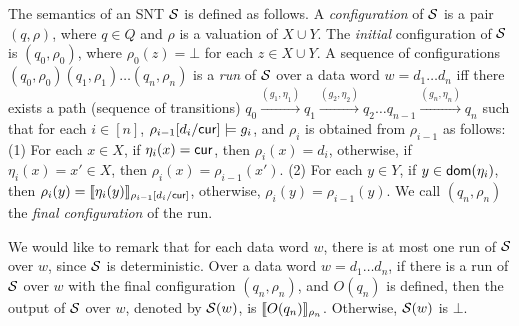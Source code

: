 The semantics of an SNT ${\mathcal{S} }$  is defined as follows. A \emph{configuration} of ${\mathcal{S} }$ is a pair $(q,\rho)$, where $q \in Q$ and $\rho$ is a valuation of $X \cup Y$. The \emph{initial} configuration of ${\mathcal{S} }$ is $(q_0,\rho_0)$, where $\rho_0(z)=\bot$ for each $z \in X\cup Y$.
A sequence of configurations $(q_0,\rho_0)(q_1,\rho_1)\ldots(q_n,\rho_n)$ is
a \emph{run} of ${\mathcal{S} }$ over a data word $w=d_1 \dots d_n$ iff there exists a path (sequence of transitions) $q_0 \xrightarrow{(g_1,\eta_1)} q_1 \xrightarrow{(g_2,\eta_2)} q_2 \dots q_{n-1} \xrightarrow{(g_n, \eta_n)} q_n$ such that for each $i \in [n]$, $\rho_{i-1}[d_i/\mathsf{cur}] \models g_i$, and $\rho_i$ is obtained from $\rho_{i-1}$ as follows: (1) For each $x \in X$, if $\eta_i(x)=\mathsf{cur}$, then $\rho_i(x)=d_i$, otherwise, if $\eta_i(x)=x' \in X$, then $\rho_i(x)=\rho_{i-1}(x')$. (2) For each $y \in Y$, if $y \in \mathsf{dom}(\eta_i)$, then $\rho_i(y)=\llbracket\eta_i(y)\rrbracket_{\rho_{i-1}[d_i/\mathsf{cur}]}$, otherwise, $\rho_i(y)=\rho_{i-1}(y)$.
We call $(q_n,\rho_n)$ the \emph{final configuration} of the run. %

We would like to remark that for each data word $w$, there is at most one run of ${\mathcal{S} }$ over $w$, since ${\mathcal{S} }$ is deterministic. 
Over a data word $w = d_1 \dots d_n$, if there is a run of ${\mathcal{S} }$ over $w$ with the final configuration $(q_n,\rho_n)$, and $O(q_n)$ is defined, then the output of ${\mathcal{S} }$ over $w$, denoted by ${{\mathcal{S} }}(w)$, is $\llbracket O(q_n)\rrbracket_{\rho_n}$. Otherwise, ${{\mathcal{S} }}(w)$ is $\bot$.

